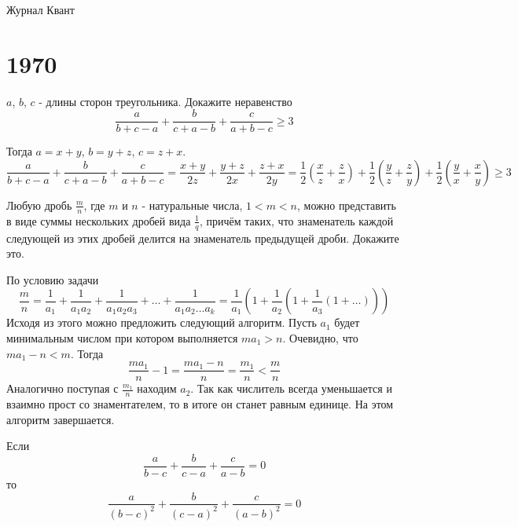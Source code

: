 \documentclass[11pt, a4paper]{common/document_template}
\begin{document}
\begin{titlepage}
  \begin{center}
	\Huge{Журнал Квант}
  \end{center}
\end{titlepage} 

\chapter{1970}

\begin{exercise}[7]
$a$, $b$, $c$ - длины сторон треугольника. Докажите неравенство
$$
\frac{a}{b + c - a} + \frac{b}{c + a - b} + \frac{c}{a + b - c} \geqslant 3
$$
\end{exercise}

\begin{Solution}
Тогда $a = x + y$, $b = y + z$, $c = z + x$.
$$
\frac{a}{b + c - a} + \frac{b}{c + a - b} + \frac{c}{a + b - c} = \frac{x + y}{2z} + \frac{y + z}{2x} + \frac{z + x}{2y} = \frac{1}{2}\left( \frac{x}{z} + \frac{z}{x} \right) + \frac{1}{2} \left( \frac{y}{z} + \frac{z}{y} \right) + \frac{1}{2}\left( \frac{y}{x} + \frac{x}{y} \right) \geqslant 3
$$
\end{Solution}

\begin{exercise}[24]
Любую дробь $\frac{m}{n}$, где $m$ и $n$ - натуральные числа, $1 < m < n$, можно представить в виде суммы нескольких дробей вида $\frac{1}{q}$, причём таких, что знаменатель каждой следующей из этих дробей делится на знаменатель предыдущей дроби. Докажите это.
\end{exercise}

\begin{Solution}
По условию задачи
$$
\frac{m}{n} = \frac{1}{a_{1}} + \frac{1}{a_{1}a_{2}} + \frac{1}{a_{1}a_{2}a_{3}} + \dots + \frac{1}{a_{1}a_{2}\dots a_{k}} = \frac{1}{a_{1}} \left( 1 + \frac{1}{a_{2}} \left( 1 + \frac{1}{a_{3}} (1 + \dots ) \right) \right)
$$
Исходя из этого можно предложить следующий алгоритм. Пусть $a_{1}$ будет  минимальным числом при котором выполняется $ma_{1} > n$. Очевидно, что $ma_{1} - n < m$. Тогда 
$$
\frac{ma_{1}}{n} - 1 = \frac{ma_{1}-n}{n} = \frac{m_{1}}{n} < \frac{m}{n}
$$
Аналогично поступая с $\frac{m_{1}}{n}$ находим $a_{2}$. Так как числитель всегда уменьшается и взаимно прост со знаментателем, то в итоге он станет равным единице. На этом алгоритм завершается. 
\end{Solution}

\begin{exercise}[27]
Если
$$
\frac{a}{b-c} + \frac{b}{c-a} + \frac{c}{a-b} = 0
$$
то
$$
\frac{a}{(b-c)^{2}} + \frac{b}{(c-a)^{2}} + \frac{c}{(a-b)^{2}} = 0
$$
\end{exercise}
\end{document}
